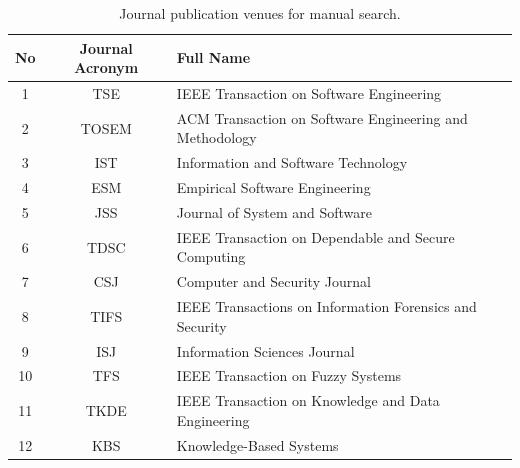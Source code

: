 \begin{table}[h]
\caption{Journal publication venues for manual search.}
{%
\begin{tabular}{ccl}
\toprule
No & Journal Acronym & Full Name                                               \\
\midrule
1  & TSE             & IEEE Transaction on Software Engineering                \\
2  & TOSEM           & ACM Transaction on Software Engineering and Methodology     \\
3  & IST             & Information and Software Technology                     \\
4  & ESM             & Empirical Software Engineering                          \\
5  & JSS             & Journal of System and Software                         \\
6  & TDSC            & IEEE Transaction on Dependable and Secure Computing     \\
7  & CSJ             & Computer and Security Journal                           \\
8  & TIFS            & IEEE Transactions on Information Forensics and Security \\
9  & ISJ             & Information Sciences Journal                            \\
10 & TFS             & IEEE Transaction on Fuzzy Systems                       \\
11 & TKDE            & IEEE Transaction on Knowledge and Data Engineering \\
12 & KBS             & Knowledge-Based Systems \\
\bottomrule
\end{tabular}}
\label{tbl:jourLegend}
\end{table}